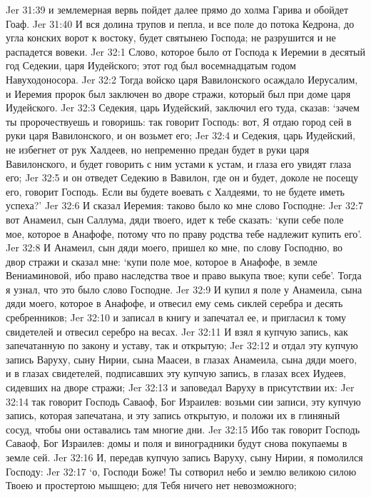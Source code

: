 Jer 31:39  и землемерная вервь пойдет далее прямо до холма Гарива и обойдет Гоаф.
Jer 31:40  И вся долина трупов и пепла, и все поле до потока Кедрона, до угла конских ворот к востоку, будет святынею Господа; не разрушится и не распадется вовеки.
Jer 32:1  Слово, которое было от Господа к Иеремии в десятый год Седекии, царя Иудейского; этот год был восемнадцатым годом Навуходоносора.
Jer 32:2  Тогда войско царя Вавилонского осаждало Иерусалим, и Иеремия пророк был заключен во дворе стражи, который был при доме царя Иудейского.
Jer 32:3  Седекия, царь Иудейский, заключил его туда, сказав: `зачем ты пророчествуешь и говоришь: так говорит Господь: вот, Я отдаю город сей в руки царя Вавилонского, и он возьмет его;
Jer 32:4  и Седекия, царь Иудейский, не избегнет от рук Халдеев, но непременно предан будет в руки царя Вавилонского, и будет говорить с ним устами к устам, и глаза его увидят глаза его;
Jer 32:5  и он отведет Седекию в Вавилон, где он и будет, доколе не посещу его, говорит Господь. Если вы будете воевать с Халдеями, то не будете иметь успеха?'
Jer 32:6  И сказал Иеремия: таково было ко мне слово Господне:
Jer 32:7  вот Анамеил, сын Саллума, дяди твоего, идет к тебе сказать: `купи себе поле мое, которое в Анафофе, потому что по праву родства тебе надлежит купить его'.
Jer 32:8  И Анамеил, сын дяди моего, пришел ко мне, по слову Господню, во двор стражи и сказал мне: `купи поле мое, которое в Анафофе, в земле Вениаминовой, ибо право наследства твое и право выкупа твое; купи себе'. Тогда я узнал, что это было слово Господне.
Jer 32:9  И купил я поле у Анамеила, сына дяди моего, которое в Анафофе, и отвесил ему семь сиклей серебра и десять сребренников;
Jer 32:10  и записал в книгу и запечатал ее, и пригласил к тому свидетелей и отвесил серебро на весах.
Jer 32:11  И взял я купчую запись, как запечатанную по закону и уставу, так и открытую;
Jer 32:12  и отдал эту купчую запись Варуху, сыну Нирии, сына Маасеи, в глазах Анамеила, сына дяди моего, и в глазах свидетелей, подписавших эту купчую запись, в глазах всех Иудеев, сидевших на дворе стражи;
Jer 32:13  и заповедал Варуху в присутствии их:
Jer 32:14  так говорит Господь Саваоф, Бог Израилев: возьми сии записи, эту купчую запись, которая запечатана, и эту запись открытую, и положи их в глиняный сосуд, чтобы они оставались там многие дни.
Jer 32:15  Ибо так говорит Господь Саваоф, Бог Израилев: домы и поля и виноградники будут снова покупаемы в земле сей.
Jer 32:16  И, передав купчую запись Варуху, сыну Нирии, я помолился Господу:
Jer 32:17  `о, Господи Боже! Ты сотворил небо и землю великою силою Твоею и простертою мышцею; для Тебя ничего нет невозможного;
